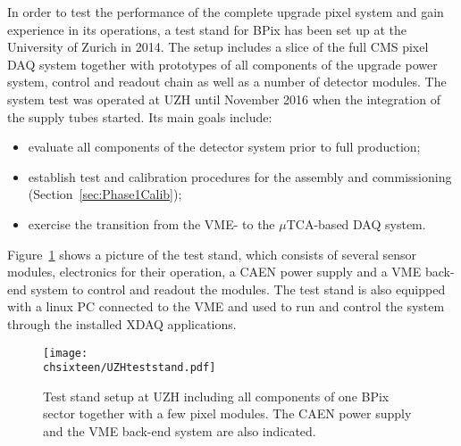 In order to test the performance of the complete upgrade pixel system and gain experience in its operations, a test stand for BPix has been set up at the University of Zurich in 2014.
The setup includes a slice of the full CMS pixel DAQ system together with prototypes of all components of the upgrade power system, control and readout chain as well as a number of detector modules.
The system test was operated at UZH until November 2016 when the integration of the supply tubes started.
Its main goals include:
\begin{itemize}
\item evaluate all components of the detector system prior to full production;
\item establish test and calibration procedures for the assembly and commissioning (Section~\ref{sec:Phase1Calib});
\item exercise the transition from the VME- to the $\mu$TCA-based DAQ system.
\end{itemize}

Figure~\ref{fig:TestStandUZH} shows a picture of the test stand,
which consists of several sensor modules, electronics for their operation, a CAEN power supply and a VME back-end system to control and readout the modules.
The test stand is also equipped with a linux PC connected to the VME and used to run and control the system through the installed XDAQ applications.

\begin{figure}[!htb]
 \begin{center}
 \texttt{[image: \\chsixteen/UZHteststand.pdf]}
 \end{center}
 \caption{Test stand setup at UZH including all components of one BPix sector together with a few pixel modules. The CAEN power supply and the VME back-end system are also indicated.}
 \label{fig:TestStandUZH}
\end{figure} 


